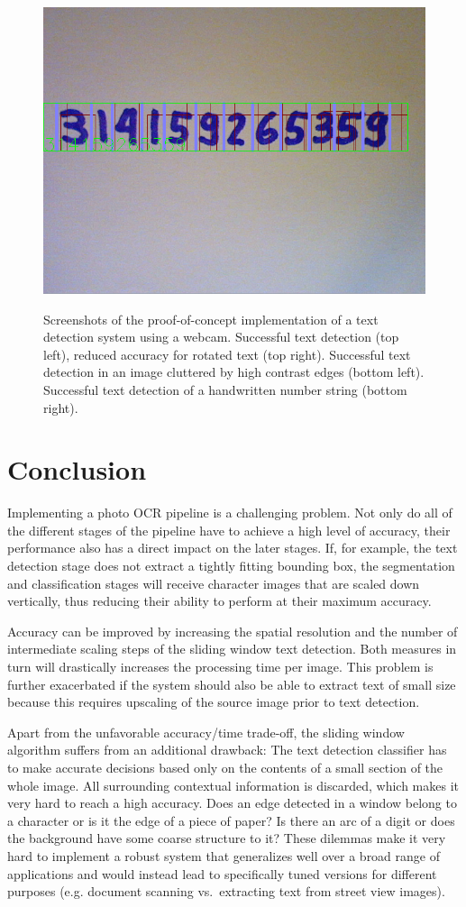 \documentclass[12pt]{article}
\begin{document}
\begin{figure}[ht]
{      \includegraphics[width=0.5\linewidth]{fig/screenshots/33b6758a-5d0a-4725-8cef-74935f3d9174}
    }
    \caption
    {
      Screenshots of the proof-of-concept implementation of a text detection system using
      a webcam. Successful text detection (top left), reduced accuracy for rotated text (top right).
      Successful text detection in an image cluttered by high contrast edges (bottom left).
      Successful text detection of a handwritten number string (bottom right).
    }
    \label{fig:webcam}
\end{figure}

\section{Conclusion}
Implementing a photo OCR pipeline is a challenging problem. Not only do all of the different stages
of the pipeline have to achieve a high level of accuracy, their performance also has a direct
impact on the later stages. If, for example, the text detection stage does not extract a tightly
fitting bounding box, the segmentation and classification stages will receive character images
that are scaled down vertically, thus reducing their ability to perform at their maximum
accuracy.

Accuracy can be improved by increasing the spatial resolution and the number of intermediate scaling steps
of the sliding window text detection.
Both measures in turn will drastically increases the processing time per image. This problem is
further exacerbated if the system should also be able to extract text of small size because
this requires upscaling of the source image prior to text detection.

Apart from the unfavorable accuracy/time trade-off, the sliding window algorithm suffers from an additional
drawback: The text detection classifier has to make accurate decisions based only on the contents
of a small section of the whole image. All surrounding contextual information is discarded, which
makes it very hard to reach a high accuracy. Does an edge detected in a window belong to a character
or is it the edge of a piece of paper? Is there an arc of a digit or does the background have
some coarse structure to it? These dilemmas make it very hard
to implement a robust system that generalizes well over a broad range of applications and
would instead lead to specifically tuned versions for different purposes
(e.g. document scanning vs.\ extracting text from street view images).
\end{document}

